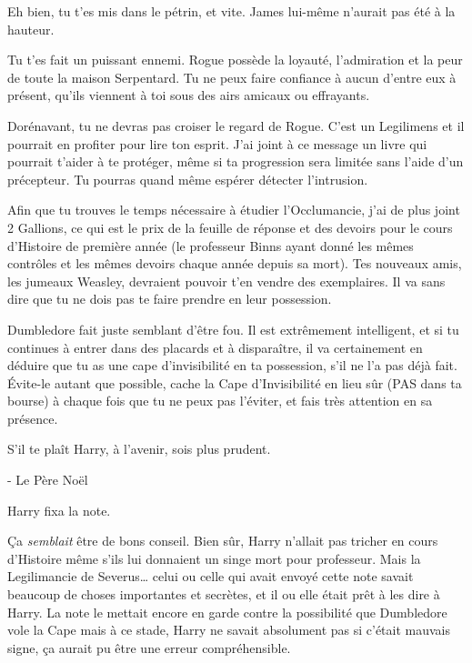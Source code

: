 \begin{writtenNote}
Eh bien, tu t'es mis dans le pétrin, et vite. James lui-même n'aurait pas été à la hauteur.

Tu t'es fait un puissant ennemi. Rogue possède la loyauté, l'admiration et la peur de toute la maison Serpentard. Tu ne peux faire confiance à aucun d'entre eux à présent, qu'ils viennent à toi sous des airs amicaux ou effrayants.

Dorénavant, tu ne devras pas croiser le regard de Rogue. C'est un Legilimens et il pourrait en profiter pour lire ton esprit. J'ai joint à ce message un livre qui pourrait t'aider à te protéger, même si ta progression sera limitée sans l'aide d'un précepteur. Tu pourras quand même espérer détecter l'intrusion.

Afin que tu trouves le temps nécessaire à étudier l'Occlumancie, j'ai de plus joint 2 Gallions, ce qui est le prix de la feuille de réponse et des devoirs pour le cours d'Histoire de première année (le professeur Binns ayant donné les mêmes contrôles et les mêmes devoirs chaque année depuis sa mort). Tes nouveaux amis, les jumeaux Weasley, devraient pouvoir t'en vendre des exemplaires. Il va sans dire que tu ne dois pas te faire prendre en leur possession.

Dumbledore fait juste semblant d'être fou. Il est extrêmement intelligent, et si tu continues à entrer dans des placards et à disparaître, il va certainement en déduire que tu as une cape d'invisibilité en ta possession, s'il ne l'a pas déjà fait. Évite-le autant que possible, cache la Cape d'Invisibilité en lieu sûr (PAS dans ta bourse) à chaque fois que tu ne peux pas l'éviter, et fais très attention en sa présence.

S'il te plaît Harry, à l'avenir, sois plus prudent.

- Le Père Noël
\end{writtenNote}

Harry fixa la note.

Ça \emph{semblait} être de bons conseil. Bien sûr, Harry n'allait pas tricher en cours d'Histoire même s'ils lui donnaient un singe mort pour professeur. Mais la Legilimancie de Severus… celui ou celle qui avait envoyé cette note savait beaucoup de choses importantes et secrètes, et il ou elle était prêt à les dire à Harry. La note le mettait encore en garde contre la possibilité que Dumbledore vole la Cape mais à ce stade, Harry ne savait absolument pas si c'était mauvais signe, ça aurait pu être une erreur compréhensible.

